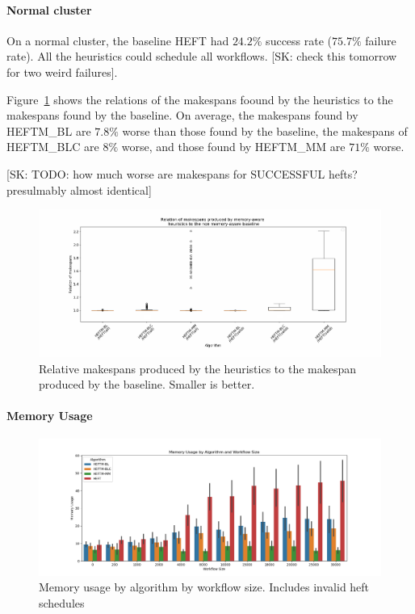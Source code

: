 \documentclass[conference]{IEEEtran}
\newcommand{\algo}[1]{\textsc{#1}}
\newcommand{\heft}{\algo{HEFT}\xspace}
\newcommand{\heftmm}{\algo{HEFTM\_MM}\xspace}
\newcommand{\heftbl}{\algo{HEFTM\_BL}\xspace}
\newcommand{\heftblc}{\algo{HEFTM\_BLC}\xspace}
\newcommand{\skug}[1]{{\color{blue}[SK: #1]}}
\begin{document}
    \paragraph{Normal cluster}

    On a normal cluster, the baseline \heft had $24.2\%$ success rate ($75.7\%$ failure rate).
    All the heuristics could schedule all workflows. \skug{check this tomorrow for two weird failures}.

    Figure~\ref{fig:ms-relations} shows the relations of the makespans foound by the heuristics to the makespans found by the baseline.
    On average, the makespans found by \heftbl are $7.8\%$ worse than those found by the baseline, the makespans of \heftblc are $8\%$
    worse, and those found by \heftmm are $71\%$ worse.

    \skug{TODO: how much worse are makespans for SUCCESSFUL hefts? presulmably almost identical}


    \begin{figure}[tb]
        \centering
        \includegraphics[width=0.495\columnwidth] {images/MsRelations2}
        \caption{Relative makespans produced by the heuristics to the makespan produced by the baseline. Smaller is better.}
        \label{fig:ms-relations}
        \vspace{-0.3cm}
    \end{figure}

    \paragraph{Memory Usage}

    \begin{figure}[tb]
        \centering
        \includegraphics[width=1.1\columnwidth] {images/mem-usage-normal}
        \caption{Memory usage by algorithm by workflow size. Includes invalid heft schedules}
        \label{fig:mem-usages}
        \vspace{-0.3cm}
    \end{figure}
\end{document}
